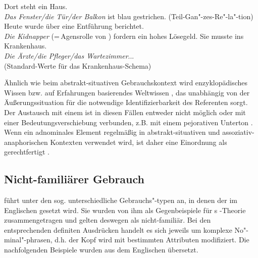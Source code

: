 \begin{exe}
	\ex \label{ex:asso3}   
	\begin{xlist}
		\ex \label{ex:meronymie} Dort steht ein  Haus. \\ \textit{Das Fenster/die Tür/der Balkon} ist blau gestrichen. (Teil-Gan"-zes-Re"-la"-tion)
		\ex \label{ex:rolle} Heute wurde über eine Entführung berichtet. \\ \textit{Die Kidnapper} (=\,Agensrolle  von ) fordern ein hohes Lösegeld.
				\ex \label{ex:krank} Sie musste ins Krankenhaus. \\ \textit{Die Ärzte/die Pfleger/das Wartezimmer}...\\(Standard-Werte für das Krankenhaus-Schema)
		\end{xlist}
\end{exe}

Ähnlich wie beim abstrakt-situativen  Gebrauchskontext wird enzyklopädisches Wissen bzw. auf Erfahrungen basierendes Weltwissen , das unabhängig von der Äußerungssituation für die notwendige Identifizierbarkeit des Referenten sorgt. Der Austausch mit einem  ist in diesen Fällen entweder nicht möglich oder mit einer Bedeutungsverschiebung verbunden, z.B. mit einem pejorativen Unterton \parencite[989]{Hauenschild1993}. Wenn ein adnominales Element regelmäßig in abstrakt-situativen  und assoziativ-anaphorischen  Kontexten verwendet wird, ist daher eine Einordnung als  gerechtfertigt \parencite[190]{Himmelmann1997}.

\subsection{Nicht-familiärer Gebrauch}\label{sec:nicht-fam}

\textcite[130--149]{Hawkins1978} führt unter den sog.  unterschiedliche Gebrauchs"-typen an, in denen der  im Englischen gesetzt wird. Sie wurden von ihm als Gegenbeispiele für \citeauthor{Christophersen1939}s -Theorie zusammengetragen und gelten deswegen als nicht-familiär. Bei den entsprechenden definiten Ausdrücken handelt es sich jeweils um komplexe  No"-minal"-phrasen, d.h. der Kopf wird mit bestimmten Attributen modifiziert. Die nachfolgenden Beispiele \parencite[vgl. die Übersicht in][37]{Himmelmann1997} wurden aus dem Englischen übersetzt.
 
